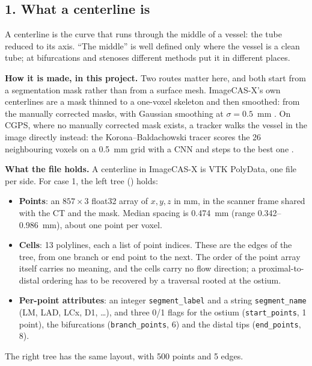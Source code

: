 \subsection*{1. What a centerline is}

A centerline is the curve that runs through the middle of a vessel: the tube reduced to its axis.
``The middle'' is well defined only where the vessel is a clean tube; at bifurcations and stenoses
different methods put it in different places.

\textbf{How it is made, in this project.} Two routes matter here, and both start from a
segmentation mask rather than from a surface mesh. ImageCAS-X's own centerlines are a mask thinned
to a one-voxel skeleton and then smoothed: from the manually corrected masks, with Gaussian
smoothing at $\sigma = 0.5$~mm \cite{bransby2026imagecasx}. On CGPS, where no manually corrected
mask exists, a tracker walks the vessel in the image directly instead: the Korona--Baldachowski
tracer scores the 26 neighbouring voxels on a 0.5~mm grid with a CNN and steps to the best one
\cite{korona2025tracing}.

\textbf{What the file holds.} A centerline in ImageCAS-X is VTK PolyData, one file per side. For
case 1, the left tree () holds:
\begin{itemize}
  \item \textbf{Points}: an $857 \times 3$ float32 array of $x, y, z$ in mm, in the scanner frame
    shared with the CT and the mask. Median spacing is 0.474~mm (range 0.342--0.986~mm), about one
    point per voxel.
  \item \textbf{Cells}: 13 polylines, each a list of point indices. These are the edges of the
    tree, from one branch or end point to the next. The order of the point array itself carries no
    meaning, and the cells carry no flow direction; a proximal-to-distal ordering has to be
    recovered by a traversal rooted at the ostium.
  \item \textbf{Per-point attributes}: an integer \texttt{segment\_label} and a string
    \texttt{segment\_name} (LM, LAD, LCx, D1, \ldots), and three 0/1 flags for the ostium
    (\texttt{start\_points}, 1 point), the bifurcations (\texttt{branch\_points}, 6) and the
    distal tips (\texttt{end\_points}, 8).
\end{itemize}
The right tree has the same layout, with 500 points and 5 edges.

